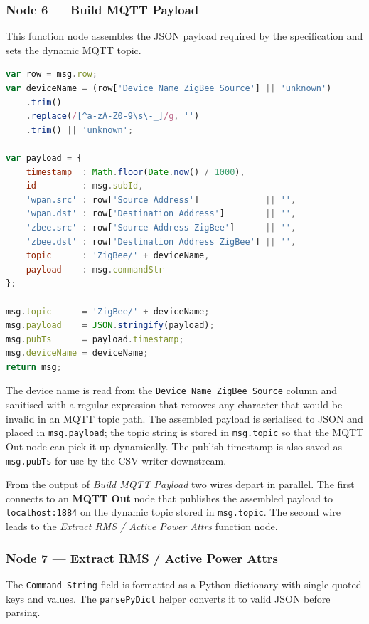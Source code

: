 \documentclass[a4paper,11pt]{article}
\begin{document}
\subsubsection*{Node 6 — Build MQTT Payload}

This function node assembles the JSON payload required by the specification and sets the dynamic MQTT topic.

\begin{lstlisting}[language=JavaScript, caption={Build MQTT payload -- function node.}]
var row = msg.row;
var deviceName = (row['Device Name ZigBee Source'] || 'unknown')
    .trim()
    .replace(/[^a-zA-Z0-9\s\-_]/g, '')
    .trim() || 'unknown';

var payload = {
    timestamp  : Math.floor(Date.now() / 1000),
    id         : msg.subId,
    'wpan.src' : row['Source Address']             || '',
    'wpan.dst' : row['Destination Address']        || '',
    'zbee.src' : row['Source Address ZigBee']      || '',
    'zbee.dst' : row['Destination Address ZigBee'] || '',
    topic      : 'ZigBee/' + deviceName,
    payload    : msg.commandStr
};

msg.topic      = 'ZigBee/' + deviceName;
msg.payload    = JSON.stringify(payload);
msg.pubTs      = payload.timestamp;
msg.deviceName = deviceName;
return msg;
\end{lstlisting}

The device name is read from the \texttt{Device Name ZigBee Source} column and sanitised with a regular expression that removes any character that would be invalid in an MQTT topic path. The assembled payload is serialised to JSON and placed in \texttt{msg.payload}; the topic string is stored in \texttt{msg.topic} so that the MQTT Out node can pick it up dynamically. The publish timestamp is also saved as \texttt{msg.pubTs} for use by the CSV writer downstream.

From the output of \textit{Build MQTT Payload} two wires depart in parallel. The first connects to an \textbf{MQTT Out} node that publishes the assembled payload to \texttt{localhost:1884} on the dynamic topic stored in \texttt{msg.topic}. The second wire leads to the \textit{Extract RMS / Active Power Attrs} function node.

\subsubsection*{Node 7 — Extract RMS / Active Power Attrs}

The \texttt{Command String} field is formatted as a Python dictionary with single-quoted keys and values. The \texttt{parsePyDict} helper converts it to valid JSON before parsing.
\end{document}
